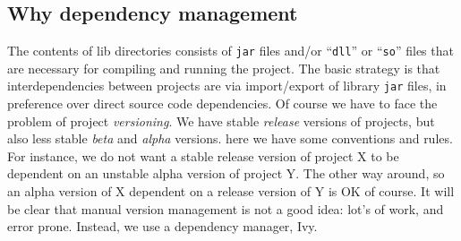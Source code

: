\subsection{Why dependency management}
The contents of lib directories consists of \verb"jar" files and/or ``\verb"dll"'' or ``\verb"so"'' files
that are necessary for compiling and running the project. The basic strategy is that interdependencies between projects
are via import/export of library \verb"jar" files, in preference over direct source code dependencies.
Of course we have to face the problem of project \emph{versioning}. We have stable \emph{release} versions
of projects, but also less stable \emph{beta} and \emph{alpha} versions.
here we have some conventions and rules. For instance, we do not want a stable release version of project X
to be dependent on an unstable alpha version of project Y. The other way around, so an alpha version of X dependent
on a release version of Y is OK of course.  It will be clear that manual version management is not a good idea: lot's of work, and error prone. Instead, we use a dependency manager, Ivy.
